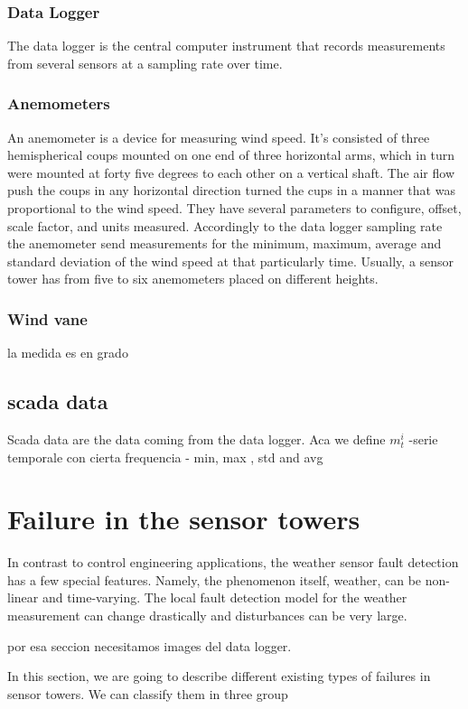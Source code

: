 \documentclass[journal]{IEEEtran}
\begin{document}
\subsubsection{Data Logger}
The data logger is the central computer instrument that records measurements from several sensors at a sampling rate over time.
\subsubsection{Anemometers}
An anemometer is a device for measuring wind speed. It's consisted of three hemispherical coups mounted on one end of three horizontal arms, which in turn were mounted at forty five degrees to each other on a vertical shaft. The air flow push the coups in any horizontal direction turned the cups in a manner that was proportional to the wind speed. They have several parameters to configure, offset, scale factor, and units measured. Accordingly to the data logger sampling rate the anemometer send measurements for the minimum, maximum, average and standard deviation of the wind speed at that particularly time. Usually, a sensor tower has from five to six anemometers placed on different heights.  
\subsubsection{Wind vane}
la medida es en grado
\subsection{scada data}\label{subsec:scadaData}
Scada data are the data coming from the data logger.  Aca we define $m_t^i$ 
-serie temporale con cierta frequencia
- min, max , std and avg


\section{Failure in the sensor towers}\label{sec:failures}
In contrast to control engineering applications, the weather sensor fault detection has a few special features. Namely, the phenomenon itself, weather, can be non-linear and time-varying. The local fault detection model for the weather measurement can change drastically and disturbances can be very large.

por esa seccion necesitamos images del data logger.


In this section, we are going to describe different existing types of failures in sensor towers. We can classify them in three group
\end{document}
